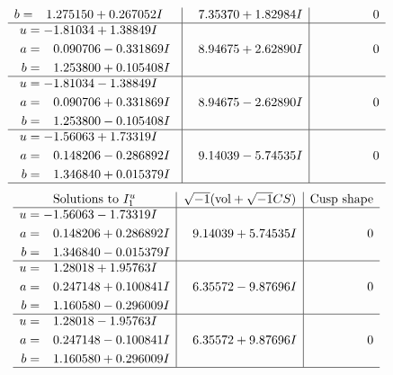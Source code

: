 \documentclass[1p]{elsarticle_modified}
\theoremstyle{definition}
\newcommand{\I}{\sqrt{-1}}
\begin{document}
$$\begin{array}{c|c|c}
\begin{aligned}
b &= \phantom{-}1.275150 + 0.267052 I\end{aligned}
 & \phantom{-}7.35370 + 1.82984 I & \phantom{-0.000000 } 0 \\ \hline\begin{aligned}
u &= -1.81034 + 1.38849 I \\
a &= \phantom{-}0.090706 - 0.331869 I \\
b &= \phantom{-}1.253800 + 0.105408 I\end{aligned}
 & \phantom{-}8.94675 + 2.62890 I & \phantom{-0.000000 } 0 \\ \hline\begin{aligned}
u &= -1.81034 - 1.38849 I \\
a &= \phantom{-}0.090706 + 0.331869 I \\
b &= \phantom{-}1.253800 - 0.105408 I\end{aligned}
 & \phantom{-}8.94675 - 2.62890 I & \phantom{-0.000000 } 0 \\ \hline\begin{aligned}
u &= -1.56063 + 1.73319 I \\
a &= \phantom{-}0.148206 - 0.286892 I \\
b &= \phantom{-}1.346840 + 0.015379 I\end{aligned}
 & \phantom{-}9.14039 - 5.74535 I & \phantom{-0.000000 } 0\\
 \hline 
 \end{array}$$\newpage$$\begin{array}{c|c|c}  
\text{Solutions to }I^u_{1}& \I (\text{vol} + \sqrt{-1}CS) & \text{Cusp shape}\\
 \hline 
\begin{aligned}
u &= -1.56063 - 1.73319 I \\
a &= \phantom{-}0.148206 + 0.286892 I \\
b &= \phantom{-}1.346840 - 0.015379 I\end{aligned}
 & \phantom{-}9.14039 + 5.74535 I & \phantom{-0.000000 } 0 \\ \hline\begin{aligned}
u &= \phantom{-}1.28018 + 1.95763 I \\
a &= \phantom{-}0.247148 + 0.100841 I \\
b &= \phantom{-}1.160580 - 0.296009 I\end{aligned}
 & \phantom{-}6.35572 - 9.87696 I & \phantom{-0.000000 } 0 \\ \hline\begin{aligned}
u &= \phantom{-}1.28018 - 1.95763 I \\
a &= \phantom{-}0.247148 - 0.100841 I \\
b &= \phantom{-}1.160580 + 0.296009 I\end{aligned}
 & \phantom{-}6.35572 + 9.87696 I & \phantom{-0.000000 } 0\\
 \hline 
 \end{array}$$\newpage\newpage\renewcommand{\arraystretch}{1}
\end{document}
